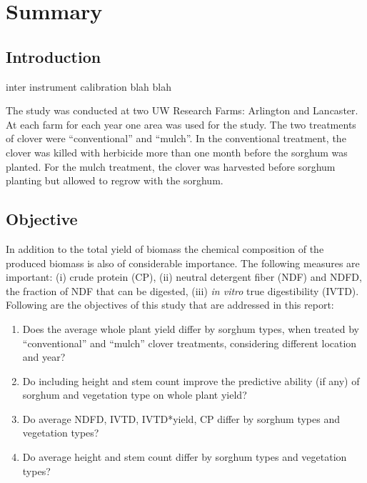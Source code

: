 \section*{Summary} \label{Sec_Summary}
\subsection*{Introduction}
inter instrument calibration
blah
blah

The study was conducted at two UW Research Farms: Arlington and Lancaster. At each farm for each year one area was used for the study. The two treatments of clover were ``conventional'' and ``mulch''.  In the conventional treatment, the clover was killed with herbicide more than one month before the sorghum was planted. For the mulch treatment, the clover was harvested before sorghum planting but allowed to regrow with the sorghum. 

\subsection*{Objective}
In addition to the total yield of biomass the chemical composition of the produced biomass is also of considerable importance. The following measures are important: (i) crude protein (CP), (ii) neutral
detergent fiber (NDF) and NDFD, the fraction of NDF that can be digested, (iii) {\emph{in vitro}} true digestibility (IVTD). Following are the objectives of this study that are addressed in this report:
\begin{enumerate}
\item Does the average whole plant yield differ by sorghum types, when treated by ``conventional'' and ``mulch'' clover treatments, considering different location and year?
\item Do including height and stem count improve the predictive ability (if any) of sorghum and vegetation type on whole plant yield?
\item Do average NDFD, IVTD, IVTD*yield, CP differ by sorghum types and vegetation types?
\item Do average height and stem count differ by sorghum types and vegetation types?
\end{enumerate}

